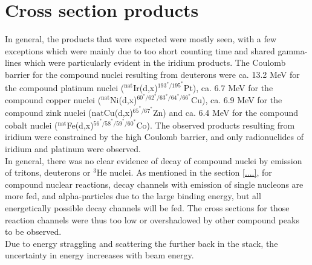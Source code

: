 \section{Cross section products}

In general, the products that were expected were mostly seen, with a few exceptions which were mainly due to too short counting time and shared gamma-lines which were particularly evident in the iridium products. The Coulomb barrier for the compound nuclei resulting from deuterons were ca. 13.2 MeV for the compound platinum nuclei ($^\text{nat}$Ir(d,x)$^{193^*/195^*}$Pt), ca. 6.7 MeV for the compound copper nuclei ($^\text{nat}$Ni(d,x)$^{60^*/62^*/63^*/64^*/66^*}$Cu), ca. 6.9 MeV for the compound zink nuclei ($\text{nat}$Cu(d,x)$^{65^*/67^*}$Zn) and ca. 6.4 MeV for the compound cobalt nuclei ($^\text{nat}$Fe(d,x)$^{56^*/58^*/59^*/60^*}$Co). The observed products resulting from iridium were constrained by the high Coulomb barrier, and only radionuclides of iridium and platinum were observed. \\

In general, there was no clear evidence of decay of compound nuclei by emission of tritons, deuterons or $^{3}$He nuclei. As mentioned in the section \ref{....}, for compound nuclear reactions, decay channels with emission of single nucleons are more fed, and alpha-particles due to the large binding energy, but all energetically possible decay channels will be fed. The cross sections for those reaction channels were thus too low or overshadowed by other compound peaks to be observed. \\

Due to energy straggling and scattering the further back in the stack, the uncertainty in energy increeases with beam energy. 





